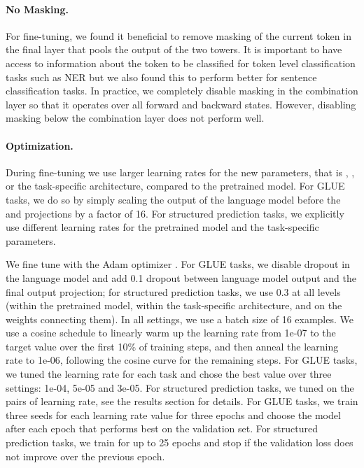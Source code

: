 \documentclass[11pt,a4paper]{article}
\begin{document}
\paragraph{No Masking.}
For fine-tuning, we found it beneficial to remove masking of the current token in the final layer that pools the output of the two towers. 
It is important to have access to information about the token to be classified for token level classification tasks such as NER but we also found this to perform better for sentence classification tasks. 
In practice, we completely disable masking in the combination layer so that it operates over all forward and backward states. However, disabling masking below the combination layer does not perform well.


\paragraph{Optimization.}
During fine-tuning we use larger learning rates for the new parameters, that is , ,  or the task-specific architecture, compared to the pretrained model.
For GLUE tasks, we do so by simply scaling the output of the language model before the  and  projections by a factor of 16. 
For structured prediction tasks, we explicitly use different learning rates for the pretrained model and the task-specific parameters.

We fine tune with the Adam optimizer \citep{kingma2015adam}. 
For GLUE tasks, we disable dropout in the language model and add 0.1 dropout between language model output and the final output projection; for structured prediction tasks, we use 0.3 at all levels (within the pretrained model, within the task-specific architecture, and on the weights connecting them).
In all settings, we use a batch size of 16 examples.
We use a cosine schedule to  linearly warm up the learning rate from 1e-07 to the target value over the first 10\% of training steps, and then anneal the learning rate to 1e-06, following the cosine curve for the remaining steps.
For GLUE tasks, we tuned the learning rate for each task and chose the best value over three settings: 1e-04, 5e-05 and 3e-05. 
For structured prediction tasks, we tuned on the pairs of learning rate, see the results section for details.  
For GLUE tasks, we train three seeds for each learning rate value for three epochs and choose the model after each epoch that performs best on the validation set. 
For structured prediction tasks, we train for up to 25 epochs and stop if the validation loss does not improve over the previous epoch.
\end{document}
